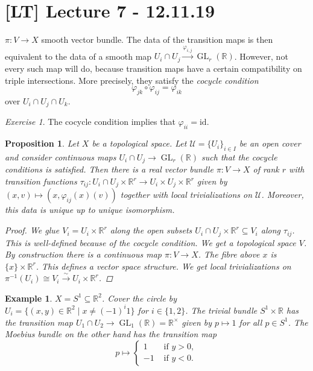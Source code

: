\documentclass[12pt]{article}
\theoremstyle{darkgreentheorem}
\newtheorem{prop}[thm]{Proposition}
\theoremstyle{darkbluedefinition}
\theoremstyle{darkredexample}
\newtheorem{exa}[thm]{Example}
\theoremstyle{remark}
\newtheorem{exe}[thm]{Exercise}
\newcommand{\R}{\mathbb{R}}
\newcommand{\1}{\mathbbm{1}}
\newcommand{\U}{\mathcal{U}}
\DeclareMathOperator{\GL}{GL}
\newcommand{\id}{\mathrm{id}}
\newcommand{\tms}{\times}
\newcommand{\sub}{\subseteq}
\begin{document}
\section{[LT] Lecture 7 - 12.11.19}

$\pi\colon V\to X$ smooth vector bundle.
The data of the transition maps is then equivalent to the data of a smooth map $U_{i}\cap U_{j}\xrightarrow{\varphi_{i,j}}\GL_{r}(\R)$.
However, not every such map will do, because transition maps have a certain compatibility on triple intersections.
More precisely, they satisfy the \textit{cocycle condition}
\[ \varphi_{jk}\circ \varphi_{ij}=\varphi_{ik} \]
over $U_{i}\cap U_{j}\cap U_{k}$.

\begin{exe}
    The cocycle condition implies that $\varphi_{ii}=\id$.
\end{exe}

\begin{prop}
    Let $X$ be a topological space.
    Let $\U=\{U_{i}\}_{i\in I}$ be an open cover and consider continuous maps $U_{i}\cap U_{j}\to \GL_{r}(\R)$ such that the cocycle conditions is satisfied.
    Then there is a real vector bundle $\pi\colon V\to X$ of rank $r$ with transition functions $\tau_{ij}\colon U_{i}\cap U_{j}\tms \R^{r}\to U_{i}\times U_{j}\tms \R^{r}$ given by $(x,v)\mapsto (x,\varphi_{ij}(x)(v))$ together with local trivializations on $\U$.
    Moreover, this data is unique up to unique isomorphism.
    \begin{proof}
	We glue $V_{i}=U_{i}\times \R^{r}$ along the open subsets $U_{i}\cap U_{j}\tms \R^{r}\sub V_{i}$ along $\tau_{ij}$.
	This is well-defined because of the cocycle condition.
	We get a topological space $V$.
	By construction there is a continuous map $\pi\colon V\to X$.
	The fibre above $x$ is $\{x\}\tms \R^{r}$.
	This defines a vector space structure.
	We get local trivializations on $\pi^{-1}(U_{i})\cong V_{i}\xrightarrow{\sim}U_{i}\tms \R^{r}$.
    \end{proof}
\end{prop}

\begin{exa}
    $X=S^{1}\sub \R^{2}$.
    Cover the circle by $U_{i}=\{(x,y)\in \R^{2}\mid x\neq (-1)^{i}1\}$ for $i\in \{1,2\}$.
    The trivial bundle $S^{1}\tms \R$ has the transition map $U_{1}\cap U_{2}\to \GL_{1}(\R)=\R^{\tms}$ given by $p\mapsto 1$ for all $p\in S^{1}$.
    The Moebius bundle on the other hand has the transition map
    \[ p\mapsto \begin{cases} 1 &\text{ if } y>0, \\ -1 &\text{ if } y<0.\end{cases} \]
\end{exa}
\end{document}
